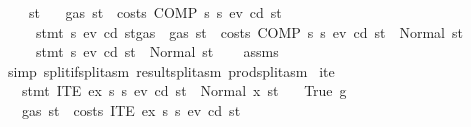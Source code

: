 \begin{isabellebody}
\ \ \ {\isacharparenleft}{\kern0pt}{}{\isacharparenright}{\kern0pt}\ st{\isacharprime}{\kern0pt}{\isacharprime}{\kern0pt}\isanewline
\ \ \ {\isachardoublequoteopen}gas\ st\ {\isachargreater}{\kern0pt}\ costs\ {\isacharparenleft}{\kern0pt}COMP\ s{}\ s{}{\isacharparenright}{\kern0pt}\ ev\ cd\ st{\isachardoublequoteclose}\isanewline
\ \ \ \ \ {\isachardoublequoteopen}stmt\ s{}\ ev\ cd\ {\isacharparenleft}{\kern0pt}st{\isasymlparr}gas\ {\isacharcolon}{\kern0pt}{\isacharequal}{\kern0pt}\ gas\ st\ {\isacharminus}{\kern0pt}\ costs\ {\isacharparenleft}{\kern0pt}COMP\ s{}\ s{}{\isacharparenright}{\kern0pt}\ ev\ cd\ st{\isasymrparr}{\isacharparenright}{\kern0pt}\ {\isacharequal}{\kern0pt}\ Normal{\isacharparenleft}{\kern0pt}{\isacharparenleft}{\kern0pt}{\isacharparenright}{\kern0pt}{\isacharcomma}{\kern0pt}\ st{\isacharprime}{\kern0pt}{\isacharprime}{\kern0pt}{\isacharparenright}{\kern0pt}{\isachardoublequoteclose}\isanewline
\ \ \ \ \ {\isachardoublequoteopen}stmt\ s{}\ ev\ cd\ st{\isacharprime}{\kern0pt}{\isacharprime}{\kern0pt}\ {\isacharequal}{\kern0pt}\ Normal{\isacharparenleft}{\kern0pt}{\isacharparenleft}{\kern0pt}{\isacharparenright}{\kern0pt}{\isacharcomma}{\kern0pt}\ st{\isacharprime}{\kern0pt}{\isacharparenright}{\kern0pt}{\isachardoublequoteclose}\isanewline
%
\isadelimproof
\ \ %
\endisadelimproof
%
\isatagproof
{}\isamarkupfalse%
\ assms\ \isamarkupfalse%
\ {\isacharparenleft}{\kern0pt}simp\ split{\isacharcolon}{\kern0pt}if{\isacharunderscore}{\kern0pt}split{\isacharunderscore}{\kern0pt}asm\ result{\isachardot}{\kern0pt}split{\isacharunderscore}{\kern0pt}asm\ prod{\isachardot}{\kern0pt}split{\isacharunderscore}{\kern0pt}asm{\isacharparenright}{\kern0pt}%
\endisatagproof
{\isafoldproof}%
%
\isadelimproof
\isanewline
%
\endisadelimproof
\isanewline
{}\isamarkupfalse%
\ ite{\isacharcolon}{\kern0pt}\isanewline
\ \ \ {\isachardoublequoteopen}stmt\ {\isacharparenleft}{\kern0pt}ITE\ ex\ s{}\ s{}{\isacharparenright}{\kern0pt}\ ev\ cd\ st\ {\isacharequal}{\kern0pt}\ Normal\ {\isacharparenleft}{\kern0pt}x{\isacharcomma}{\kern0pt}\ st{\isacharprime}{\kern0pt}{\isacharparenright}{\kern0pt}{\isachardoublequoteclose}\isanewline
\ \ \ {\isacharparenleft}{\kern0pt}True{\isacharparenright}{\kern0pt}\ g\isanewline
\ \ \ {\isachardoublequoteopen}gas\ st\ {\isachargreater}{\kern0pt}\ costs\ {\isacharparenleft}{\kern0pt}ITE\ ex\ s{}\ s{}{\isacharparenright}{\kern0pt}\ ev\ cd\ st{\isachardoublequoteclose}\isanewline

\end{isabellebody}
